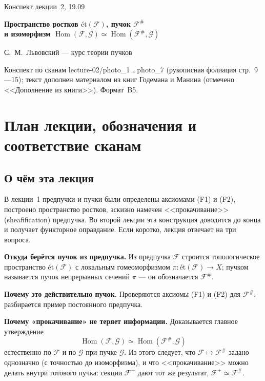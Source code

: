 \documentclass[11pt,b5paper]{article}
\newcommand{\et}{\text{ét}}
\newcommand{\Hom}{\operatorname{Hom}}
\newcommand{\Shv}[1]{\mathscr{#1}}   %
\theoremstyle{plain}
\theoremstyle{definition}
\theoremstyle{remark}
\let\brutsection\section
\renewcommand{\section}{\Needspace{7\baselineskip}\brutsection}
\let\brutsubsection\subsection
\renewcommand{\subsection}{\Needspace{5\baselineskip}\brutsubsection}
\begin{document}
\thispagestyle{empty}
\vspace*{1.2cm}
\begin{center}
{\large Конспект лекции~2, 19.09\par}
\vspace{0.9cm}
{\Large\bfseries Пространство ростков $\et(\Shv{F})$, пучок
 $\Shv{F}^{\#}$\\[4pt]
 и изоморфизм
 $\Hom(\Shv{F},\Shv{G})\simeq\Hom(\Shv{F}^{\#},\Shv{G})$\par}
\vspace{0.9cm}
{\large С.~М.~Львовский --- курс теории пучков\par}
\vspace{2.2cm}
{\small Конспект по сканам lecture-02/photo\_1\,\ldots\,photo\_7
 (рукописная фолиация стр.~9---15); текст дополнен материалом из книг
 Годемана и Манина (отмечено <<Дополнение из книги>>). Формат~B5.\par}
\end{center}
\bigskip

\tableofcontents

\section{План лекции, обозначения и соответствие сканам}

\subsection{О чём эта лекция}
В лекции~1 предпучки и пучки были определены аксиомами (F1) и (F2),
построено пространство ростков, эскизно намечен <<прокачивание>>
(sheafification) предпучка. Во второй лекции эта конструкция доводится
до конца и получает функторное оправдание. Если коротко, лекция
отвечает на три вопроса.

\begin{conditions}
\item \textbf{Откуда берётся пучок из предпучка.} Из предпучка
 $\Shv{F}$ строится топологическое пространство $\et(\Shv{F})$ с
 локальным гомеоморфизмом $\pi\colon\et(\Shv{F})\to X$; пучком
 называется пучок непрерывных сечений $\pi$ --- он обозначается
 $\Shv{F}^{\#}$.
\item \textbf{Почему это действительно пучок.} Проверяются аксиомы
 (F1) и (F2) для $\Shv{F}^{\#}$; разбирается пример постоянного
 предпучка.
\item \textbf{Почему «прокачивание» не теряет информации.}
 Доказывается главное утверждение
 \[
   \Hom(\Shv{F},\Shv{G})\simeq\Hom(\Shv{F}^{\#},\Shv{G})
 \]
 естественно по $\Shv{F}$ и по $\Shv{G}$ при пучке $\Shv{G}$.
 Из этого следует, что $\Shv{F}\mapsto\Shv{F}^{\#}$ задано однозначно
 (с точностью до изоморфизма), и что <<прокачивание>> можно делать
 внутри готового пучка: секции $\Shv{F}^{+}$ дают тот же результат,
 $\Shv{F}^{+}\simeq\Shv{F}^{\#}$.
\end{conditions}
\end{document}
